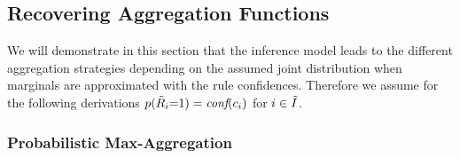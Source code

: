 \documentclass{article}
\theoremstyle{plain}
\theoremstyle{remark}
\newcommand{\atomrule}{c}
\newcommand{\onerulRV}{\Tilde{R}}
\newcommand{\indexSetAll}{\Tilde{I}}
\begin{document}

\subsection{Recovering Aggregation Functions} \label{sec: sub probab-rule-agg}
We will demonstrate in this section that the inference model leads to the different aggregation strategies depending on the assumed joint distribution when marginals are approximated with the rule confidences. Therefore we assume for the following derivations $p(\onerulRV_i{=}1) = \textit{conf}(\atomrule_i)$ for $i \in \indexSetAll$.
\subsubsection{Probabilistic Max-Aggregation}\label{sec: probab max aggregation}
\end{document}
